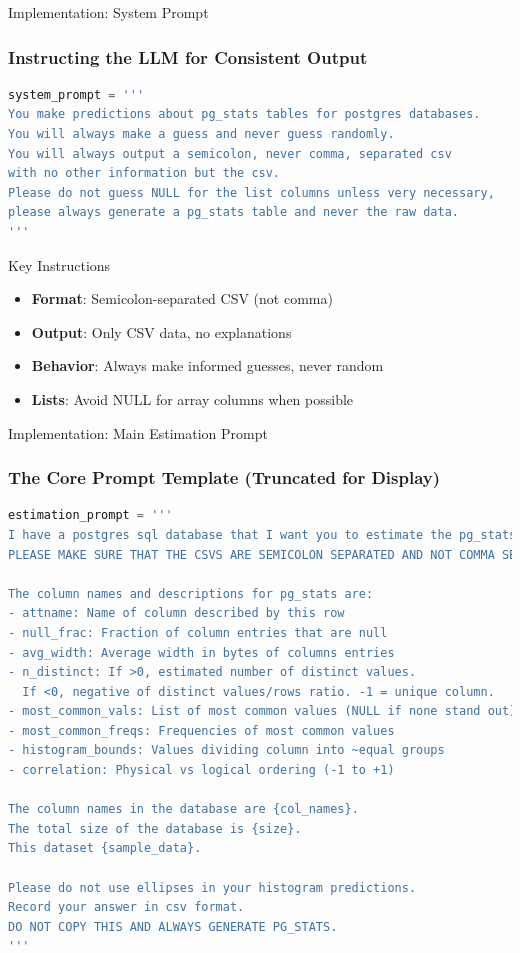 \documentclass{beamer}
\begin{document}
\begin{frame}[fragile]{Implementation: System Prompt}
\frametitle{Instructing the LLM for Consistent Output}

\begin{lstlisting}[language=Python, basicstyle=\tiny\ttfamily]
system_prompt = '''
You make predictions about pg_stats tables for postgres databases.
You will always make a guess and never guess randomly.
You will always output a semicolon, never comma, separated csv 
with no other information but the csv.
Please do not guess NULL for the list columns unless very necessary,
please always generate a pg_stats table and never the raw data.
'''
\end{lstlisting}

\begin{block}{Key Instructions}
\begin{itemize}
    \item \textbf{Format}: Semicolon-separated CSV (not comma)
    \item \textbf{Output}: Only CSV data, no explanations
    \item \textbf{Behavior}: Always make informed guesses, never random
    \item \textbf{Lists}: Avoid NULL for array columns when possible
\end{itemize}
\end{block}

\end{frame}

\begin{frame}[fragile]{Implementation: Main Estimation Prompt}
\frametitle{The Core Prompt Template (Truncated for Display)}

\begin{lstlisting}[language=Python, basicstyle=\tiny\ttfamily]
estimation_prompt = '''
I have a postgres sql database that I want you to estimate the pg_stats for.
PLEASE MAKE SURE THAT THE CSVS ARE SEMICOLON SEPARATED AND NOT COMMA SEPARATED.

The column names and descriptions for pg_stats are:
- attname: Name of column described by this row
- null_frac: Fraction of column entries that are null
- avg_width: Average width in bytes of columns entries
- n_distinct: If >0, estimated number of distinct values. 
  If <0, negative of distinct values/rows ratio. -1 = unique column.
- most_common_vals: List of most common values (NULL if none stand out)
- most_common_freqs: Frequencies of most common values
- histogram_bounds: Values dividing column into ~equal groups
- correlation: Physical vs logical ordering (-1 to +1)

The column names in the database are {col_names}.
The total size of the database is {size}.
This dataset {sample_data}.

Please do not use ellipses in your histogram predictions.
Record your answer in csv format.
DO NOT COPY THIS AND ALWAYS GENERATE PG_STATS.
'''
\end{lstlisting}

\end{frame}
\end{document}
